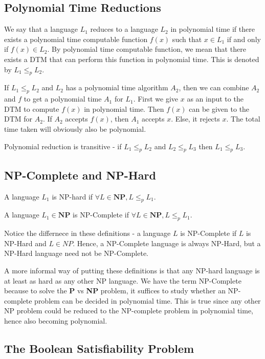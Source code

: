 \documentclass[12pt,letterpaper]{article}
\theoremstyle{definition}
\begin{document}
\subsection{Polynomial Time Reductions}

We say that a language $L_1$ reduces to a language $L_2$ in polynomial time if there exists a polynomial time computable function $f(x)$ such that $x \in L_1$ if and only if $f(x) \in L_2$. By polynomial time computable function, we mean that there exists a DTM that can perform this function in polynomial time. This is denoted by $L_1 \leq_p L_2$.

If $L_1 \leq_p L_2$ and $L_2$ has a polynomial time algorithm $A_2$, then we can combine $A_2$ and $f$ to get a polynomial time $A_1$ for $L_1$. First we give $x$ as an input to the DTM to compute $f(x)$ in polynomial time. Then $f(x)$ can be given to the DTM for $A_2$. If $A_2$ accepts $f(x)$, then $A_1$ accepts $x$. Else, it rejects $x$. The total time taken will obviously also be polynomial.

Polynomial reduction is transitive - if $L_1 \leq_p L_2$ and $L_2 \leq_p L_3$ then $L_1 \leq_p L_3$.

\subsection{NP-Complete and NP-Hard}

A language $L_1$ is NP-hard if $\forall L \in \mathbf{NP}, L \leq_p L_1$.

A language $L_1 \in \mathbf{NP}$ is NP-Complete if $\forall L \in \mathbf{NP}, L \leq_p L_1$.

Notice the differnece in these definitions - a language $L$ is NP-Complete if $L$ is NP-Hard and $L \in NP$. Hence, a NP-Complete language is always NP-Hard, but a NP-Hard language need not be NP-Complete.

A more informal way of putting these definitions is that any NP-hard language is at least as hard as any other NP language. We have the term NP-Complete because to solve the \textbf{P} vs \textbf{NP} problem, it suffices to study whether an NP-complete problem can be decided in polynomial time. This is true since any other NP problem could be reduced to the NP-complete problem in polynomial time, hence also becoming polynomial.

\subsection{The Boolean Satisfiability Problem}
\end{document}
